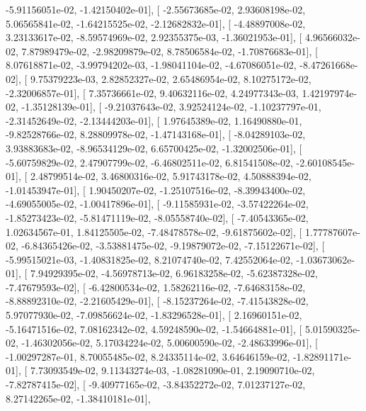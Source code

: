 \documentclass{article}
\begin{document}
         -5.91156051e-02,  -1.42150402e-01],
       [ -2.55673685e-02,   2.93608198e-02,   5.06565841e-02,
         -1.64215525e-02,  -2.12682832e-01],
       [ -4.48897008e-02,   3.23133617e-02,  -8.59574969e-02,
          2.92355375e-03,  -1.36021953e-01],
       [  4.96566032e-02,   7.87989479e-02,  -2.98209879e-02,
          8.78506584e-02,  -1.70876683e-01],
       [  8.07618871e-02,  -3.99794202e-03,  -1.98041104e-02,
         -4.67086051e-02,  -8.47261668e-02],
       [  9.75379223e-03,   2.82852327e-02,   2.65486954e-02,
          8.10275172e-02,  -2.32006857e-01],
       [  7.35736661e-02,   9.40632116e-02,   4.24977343e-03,
          1.42197974e-02,  -1.35128139e-01],
       [ -9.21037643e-02,   3.92524124e-02,  -1.10237797e-01,
         -2.31452649e-02,  -2.13444203e-01],
       [  1.97645389e-02,   1.16490880e-01,  -9.82528766e-02,
          8.28809978e-02,  -1.47143168e-01],
       [ -8.04289103e-02,   3.93883683e-02,  -8.96534129e-02,
          6.65700425e-02,  -1.32002506e-01],
       [ -5.60759829e-02,   2.47907799e-02,  -6.46802511e-02,
          6.81541508e-02,  -2.60108545e-01],
       [  2.48799514e-02,   3.46800316e-02,   5.91743178e-02,
          4.50888394e-02,  -1.01453947e-01],
       [  1.90450207e-02,  -1.25107516e-02,  -8.39943400e-02,
         -4.69055005e-02,  -1.00417896e-01],
       [ -9.11585931e-02,  -3.57422264e-02,  -1.85273423e-02,
         -5.81471119e-02,  -8.05558740e-02],
       [ -7.40543365e-02,   1.02634567e-01,   1.84125505e-02,
         -7.48478578e-02,  -9.61875602e-02],
       [  1.77787607e-02,  -6.84365426e-02,  -3.53881475e-02,
         -9.19879072e-02,  -7.15122671e-02],
       [ -5.99515021e-03,  -1.40831825e-02,   8.21074740e-02,
          7.42552064e-02,  -1.03673062e-01],
       [  7.94929395e-02,  -4.56978713e-02,   6.96183258e-02,
         -5.62387328e-02,  -7.47679593e-02],
       [ -6.42800534e-02,   1.58262116e-02,  -7.64683158e-02,
         -8.88892310e-02,  -2.21605429e-01],
       [ -8.15237264e-02,  -7.41543828e-02,   5.97077930e-02,
         -7.09856624e-02,  -1.83296528e-01],
       [  2.16960151e-02,  -5.16471516e-02,   7.08162342e-02,
          4.59248590e-02,  -1.54664881e-01],
       [  5.01590325e-02,  -1.46302056e-02,   5.17034224e-02,
          5.00600590e-02,  -2.48633996e-01],
       [ -1.00297287e-01,   8.70055485e-02,   8.24335114e-02,
          3.64646159e-02,  -1.82891171e-01],
       [  7.73093549e-02,   9.11343274e-03,  -1.08281090e-01,
          2.19090710e-02,  -7.82787415e-02],
       [ -9.40977165e-02,  -3.84352272e-02,   7.01237127e-02,
          8.27142265e-02,  -1.38410181e-01],
\end{document}
